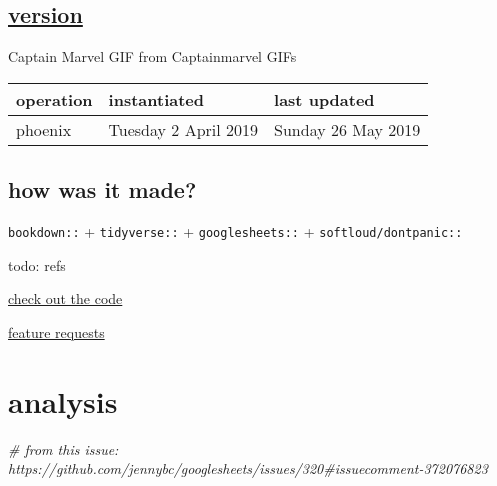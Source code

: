 \documentclass[]{book}
\newenvironment{Shaded}{\begin{snugshade}}{\end{snugshade}}
\newcommand{\CommentTok}[1]{\textcolor[rgb]{0.56,0.35,0.01}{\textit{#1}}}
\begin{document}
\hypertarget{version}{%
\section{\texorpdfstring{\protect\hyperlink{mindfulness}{version}}{version}}\label{version}}

Captain Marvel GIF from Captainmarvel GIFs

\begin{longtable}[]{@{}lll@{}}
\toprule
operation & instantiated & last updated\tabularnewline
\midrule
\endhead
phoenix & Tuesday 2 April 2019 & Sunday 26 May 2019\tabularnewline
\bottomrule
\end{longtable}

\hypertarget{how-was-it-made}{%
\section{how was it made?}\label{how-was-it-made}}

\texttt{bookdown::} + \texttt{tidyverse::} + \texttt{googlesheets::} + \texttt{softloud/dontpanic::}

todo: refs

\href{https://github.com/softloud/lifeswork}{check out the code}

\href{https://github.com/softloud/lifeswork/issues}{feature requests}

\hypertarget{analysis}{%
\chapter{analysis}\label{analysis}}

\begin{Shaded}
\begin{Highlighting}[]
\CommentTok{# from this issue: https://github.com/jennybc/googlesheets/issues/320#issuecomment-372076823}
\end{Highlighting}
\end{Shaded}
\end{document}
